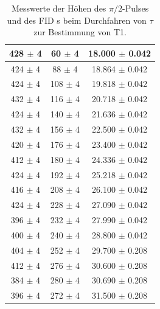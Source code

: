 \documentclass[12pt,a4paper]{article}
\begin{document}
\begin{table}
\begin{tabular}{|c|c|c|}
428 $\pm$ 4 & 60 $\pm$ 4 & 18.000 $\pm$ 0.042 \\ 
\hline 
424 $\pm$ 4 & 88 $\pm$ 4 & 18.864 $\pm$ 0.042 \\ 
\hline 
424 $\pm$ 4 & 108 $\pm$ 4 & 19.818 $\pm$ 0.042 \\ 
\hline 
432 $\pm$ 4 & 116 $\pm$ 4 & 20.718 $\pm$ 0.042 \\ 
\hline 
424 $\pm$ 4 & 140 $\pm$ 4 & 21.636 $\pm$ 0.042 \\ 
\hline 
432 $\pm$ 4 & 156 $\pm$ 4 & 22.500 $\pm$ 0.042 \\ 
\hline 
420 $\pm$ 4 & 176 $\pm$ 4 & 23.400 $\pm$ 0.042 \\ 
\hline 
412 $\pm$ 4 & 180 $\pm$ 4 & 24.336 $\pm$ 0.042 \\ 
\hline 
424 $\pm$ 4 & 192 $\pm$ 4 & 25.218 $\pm$ 0.042 \\ 
\hline 
416 $\pm$ 4 & 208 $\pm$ 4 & 26.100 $\pm$ 0.042 \\ 
\hline 
424 $\pm$ 4 & 228 $\pm$ 4 & 27.090 $\pm$ 0.042 \\ 
\hline 
396 $\pm$ 4 & 232 $\pm$ 4 & 27.990 $\pm$ 0.042 \\ 
\hline 
400 $\pm$ 4 & 240 $\pm$ 4 & 28.800 $\pm$ 0.042 \\ 
\hline 
404 $\pm$ 4 & 252 $\pm$ 4 & 29.700 $\pm$ 0.208 \\ 
\hline 
412 $\pm$ 4 & 276 $\pm$ 4 & 30.600 $\pm$ 0.208 \\ 
\hline 
384 $\pm$ 4 & 280 $\pm$ 4 & 30.690 $\pm$ 0.208 \\ 
\hline 
396 $\pm$ 4 & 272 $\pm$ 4 & 31.500 $\pm$ 0.208 \\ 
\hline 
\end{tabular} 
\caption{Messwerte der Höhen des $\pi /2$-Pulses und des FID s beim Durchfahren von $\tau$ zur Bestimmung von T1.}
\label{tab:T1_Daten}
\end{table}
\end{document}
